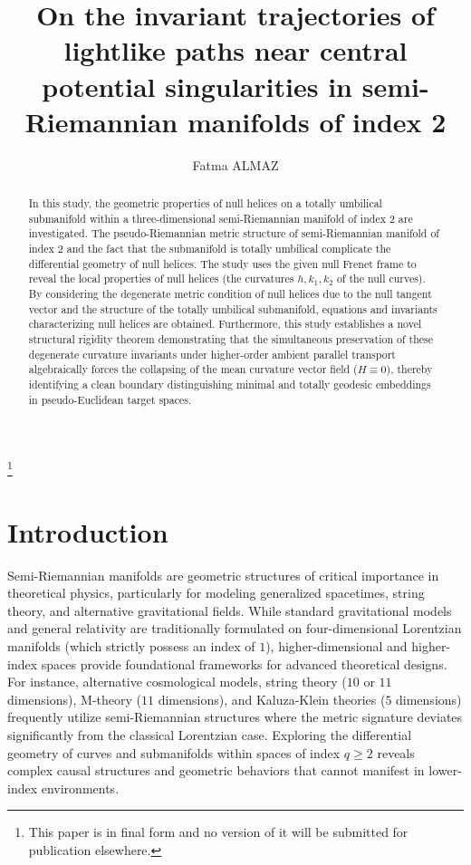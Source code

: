 \documentclass [reqno]{amsart}
\theoremstyle{plain}
\numberwithin{equation}{section}
\begin{document}
\title[]{On the invariant trajectories of lightlike paths near central potential singularities in semi-Riemannian manifolds of index 2}
\author{Fatma ALMAZ }
\address{department of mathematics, faculty of arts and sciences, batman
university, batman/ t\"{u}rk\.{ı}ye}
\thanks{This paper is in final form and no version of it will be submitted
for publication elsewhere.}

\begin{abstract}
In this study, the geometric properties of null helices on a totally umbilical submanifold within a three-dimensional semi-Riemannian manifold of index 2 are investigated. The pseudo-Riemannian metric structure of semi-Riemannian manifold of index 2 and the fact that the submanifold is totally umbilical complicate the differential geometry of null helices. The study uses the given null Frenet frame to reveal the local properties of null helices (the curvatures $h,k_1,k_2$ of the null curves). By considering the degenerate metric condition of null helices due to the null tangent vector and the structure of the totally umbilical submanifold, equations and invariants characterizing null helices are obtained. Furthermore, this study establishes a novel structural rigidity theorem demonstrating that the simultaneous preservation of these degenerate curvature invariants under higher-order ambient parallel transport algebraically forces the collapsing of the mean curvature vector field ($H\equiv 0$), thereby identifying a clean boundary distinguishing minimal and totally geodesic embeddings in pseudo-Euclidean target spaces.
\end{abstract}

\maketitle

\section{Introduction}

Semi-Riemannian manifolds are geometric structures of critical importance in theoretical physics, particularly for modeling generalized spacetimes, string theory, and alternative gravitational fields. While standard gravitational models and general relativity are traditionally formulated on four-dimensional Lorentzian manifolds (which strictly possess an index of $1$), higher-dimensional and higher-index spaces provide foundational frameworks for advanced theoretical designs. For instance, alternative cosmological models, string theory ($10$ or $11$ dimensions), M-theory ($11$ dimensions), and Kaluza-Klein theories ($5$ dimensions) frequently utilize semi-Riemannian structures where the metric signature deviates significantly from the classical Lorentzian case. Exploring the differential geometry of curves and submanifolds within spaces of index $q \geq 2$ reveals complex causal structures and geometric behaviors that cannot manifest in lower-index environments.
\end{document}
